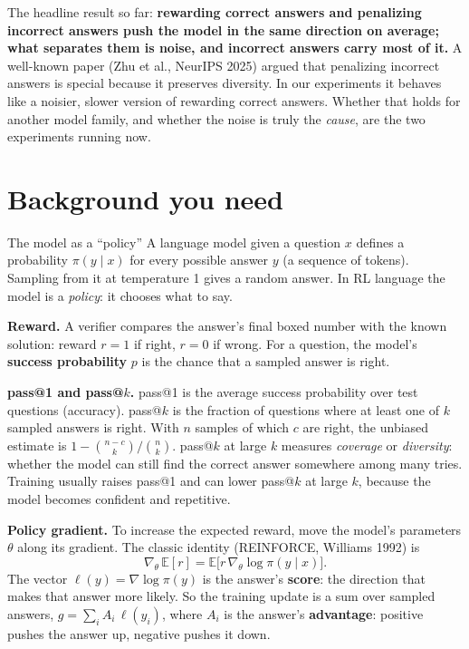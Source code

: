 \documentclass[11pt]{article}
\newcommand{\E}{\mathbb{E}}
\begin{document}
The headline result so far: \textbf{rewarding correct answers and penalizing incorrect answers push the model in the same direction on average; what separates them is noise, and incorrect answers carry most of it.} A well-known paper (Zhu et al., NeurIPS 2025) argued that penalizing incorrect answers is special because it preserves diversity. In our experiments it behaves like a noisier, slower version of rewarding correct answers. Whether that holds for another model family, and whether the noise is truly the \emph{cause}, are the two experiments running now.

\section{Background you need}

\begin{idea}{The model as a ``policy''}
A language model given a question $x$ defines a probability $\pi(y\mid x)$ for every possible answer $y$ (a sequence of tokens). Sampling from it at temperature 1 gives a random answer. In RL language the model is a \emph{policy}: it chooses what to say.
\end{idea}

\textbf{Reward.} A verifier compares the answer's final boxed number with the known solution: reward $r=1$ if right, $r=0$ if wrong. For a question, the model's \textbf{success probability} $p$ is the chance that a sampled answer is right.

\textbf{pass@1 and pass@$k$.} pass@1 is the average success probability over test questions (accuracy). pass@$k$ is the fraction of questions where at least one of $k$ sampled answers is right. With $n$ samples of which $c$ are right, the unbiased estimate is $1-\binom{n-c}{k}/\binom{n}{k}$. pass@$k$ at large $k$ measures \emph{coverage} or \emph{diversity}: whether the model can still find the correct answer somewhere among many tries. Training usually raises pass@1 and can lower pass@$k$ at large $k$, because the model becomes confident and repetitive.

\textbf{Policy gradient.} To increase the expected reward, move the model's parameters $\theta$ along its gradient. The classic identity (REINFORCE, Williams 1992) is
\[
\nabla_\theta\,\E[r] = \E\big[r\,\nabla_\theta\log\pi(y\mid x)\big].
\]
The vector $\ell(y)=\nabla\log\pi(y)$ is the answer's \textbf{score}: the direction that makes that answer more likely. So the training update is a sum over sampled answers, $g=\sum_i A_i\,\ell(y_i)$, where $A_i$ is the answer's \textbf{advantage}: positive pushes the answer up, negative pushes it down.
\end{document}
